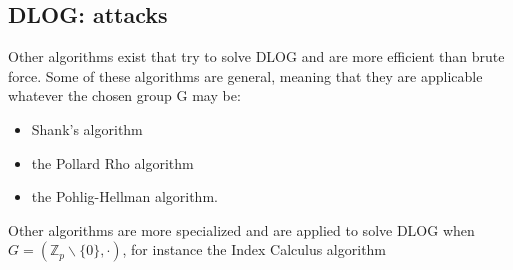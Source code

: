 \documentclass[a4paper, 10pt, titlepage]{article}
\begin{document}
\subsection{DLOG: attacks}
Other algorithms exist that try to solve DLOG and are more efficient than brute force. Some of these algorithms are general, meaning that they are applicable whatever the chosen group G may be:
\begin{itemize}
\item Shank’s algorithm
\item the Pollard Rho algorithm
\item the Pohlig-Hellman algorithm.
\end{itemize}
Other algorithms are more specialized and are applied to solve DLOG when $G = (\mathbb{Z}_p \backslash \{0\}, \cdot)$, for instance the Index Calculus algorithm
\end{document}
